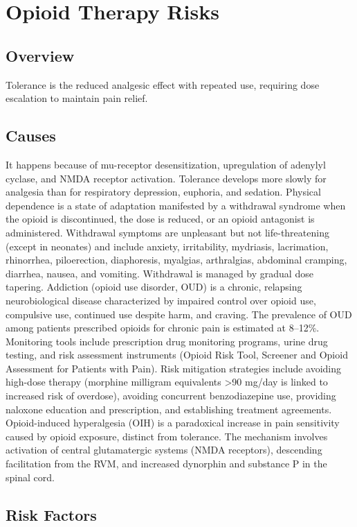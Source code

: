 \chapter{Opioid Therapy Risks}
\label{sec:Opioid Therapy Risks}

\section{Overview}
Tolerance is the reduced analgesic effect with repeated use, requiring dose escalation to maintain pain relief.
\section{Causes}
It happens because of mu-receptor desensitization, upregulation of adenylyl cyclase, and NMDA receptor activation. Tolerance develops more slowly for analgesia than for respiratory depression, euphoria, and sedation. Physical dependence is a state of adaptation manifested by a withdrawal syndrome when the opioid is discontinued, the dose is reduced, or an opioid antagonist is administered. Withdrawal symptoms are unpleasant but not life-threatening (except in neonates) and include anxiety, irritability, mydriasis, lacrimation, rhinorrhea, piloerection, diaphoresis, myalgias, arthralgias, abdominal cramping, diarrhea, nausea, and vomiting. Withdrawal is managed by gradual dose tapering. Addiction (opioid use disorder, OUD) is a chronic, relapsing neurobiological disease characterized by impaired control over opioid use, compulsive use, continued use despite harm, and craving. The prevalence of OUD among patients prescribed opioids for chronic pain is estimated at 8--12\%. Monitoring tools include prescription drug monitoring programs, urine drug testing, and risk assessment instruments (Opioid Risk Tool, Screener and Opioid Assessment for Patients with Pain). Risk mitigation strategies include avoiding high-dose therapy (morphine milligram equivalents >90 mg/day is linked to increased risk of overdose), avoiding concurrent benzodiazepine use, providing naloxone education and prescription, and establishing treatment agreements. Opioid-induced hyperalgesia (OIH) is a paradoxical increase in pain sensitivity caused by opioid exposure, distinct from tolerance. The mechanism involves activation of central glutamatergic systems (NMDA receptors), descending facilitation from the RVM, and increased dynorphin and substance P in the spinal cord.     
\section{Risk Factors}

